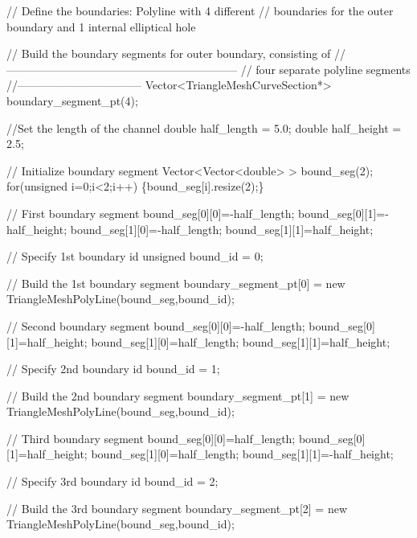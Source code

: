 \begin{DoxyCodeInclude}

 \textcolor{comment}{// Define the boundaries: Polyline with 4 different}
 \textcolor{comment}{// boundaries for the outer boundary and 1 internal elliptical hole}
 
 \textcolor{comment}{// Build the boundary segments for outer boundary, consisting of}
 \textcolor{comment}{//--------------------------------------------------------------}
 \textcolor{comment}{// four separate polyline segments}
 \textcolor{comment}{//---------------------------------}
 Vector<TriangleMeshCurveSection*> boundary\_segment\_pt(4);

 \textcolor{comment}{//Set the length of the channel}
 \textcolor{keywordtype}{double} half\_length = 5.0;
 \textcolor{keywordtype}{double} half\_height = 2.5;
 
 \textcolor{comment}{// Initialize boundary segment}
 Vector<Vector<double> > bound\_seg(2);
 \textcolor{keywordflow}{for}(\textcolor{keywordtype}{unsigned} i=0;i<2;i++) \{bound\_seg[i].resize(2);\}

 \textcolor{comment}{// First boundary segment}
 bound\_seg[0][0]=-half\_length;
 bound\_seg[0][1]=-half\_height;
 bound\_seg[1][0]=-half\_length;
 bound\_seg[1][1]=half\_height;
 
 \textcolor{comment}{// Specify 1st boundary id}
 \textcolor{keywordtype}{unsigned} bound\_id = 0;

 \textcolor{comment}{// Build the 1st boundary segment}
 boundary\_segment\_pt[0] = \textcolor{keyword}{new} TriangleMeshPolyLine(bound\_seg,bound\_id);
 
 \textcolor{comment}{// Second boundary segment}
 bound\_seg[0][0]=-half\_length;
 bound\_seg[0][1]=half\_height;
 bound\_seg[1][0]=half\_length;
 bound\_seg[1][1]=half\_height;

 \textcolor{comment}{// Specify 2nd boundary id}
 bound\_id = 1;

 \textcolor{comment}{// Build the 2nd boundary segment}
 boundary\_segment\_pt[1] = \textcolor{keyword}{new} TriangleMeshPolyLine(bound\_seg,bound\_id);

 \textcolor{comment}{// Third boundary segment}
 bound\_seg[0][0]=half\_length;
 bound\_seg[0][1]=half\_height;
 bound\_seg[1][0]=half\_length;
 bound\_seg[1][1]=-half\_height;

 \textcolor{comment}{// Specify 3rd boundary id}
 bound\_id = 2;

 \textcolor{comment}{// Build the 3rd boundary segment}
 boundary\_segment\_pt[2] = \textcolor{keyword}{new} TriangleMeshPolyLine(bound\_seg,bound\_id);


\end{DoxyCodeInclude}
